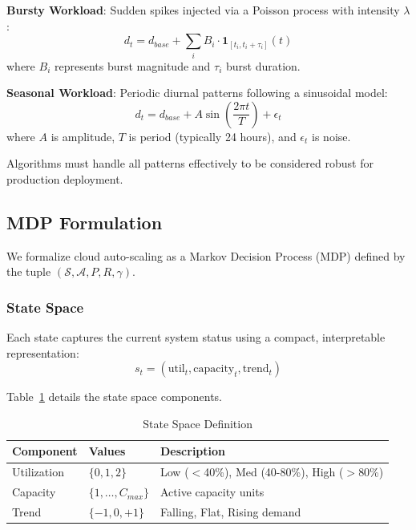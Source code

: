 \documentclass[conference]{IEEEtran}
\begin{document}
\textbf{Bursty Workload}: Sudden spikes injected via a Poisson process with intensity $\lambda$:
\begin{equation}
d_t = d_{base} + \sum_{i} B_i \cdot \mathbf{1}_{[t_i, t_i + \tau_i]}(t)
\end{equation}
where $B_i$ represents burst magnitude and $\tau_i$ burst duration.

\textbf{Seasonal Workload}: Periodic diurnal patterns following a sinusoidal model:
\begin{equation}
d_t = d_{base} + A \sin\left(\frac{2\pi t}{T}\right) + \epsilon_t
\end{equation}
where $A$ is amplitude, $T$ is period (typically 24 hours), and $\epsilon_t$ is noise.

Algorithms must handle all patterns effectively to be considered robust for production deployment.

\subsection{MDP Formulation}
We formalize cloud auto-scaling as a Markov Decision Process (MDP) defined by the tuple $(\mathcal{S}, \mathcal{A}, P, R, \gamma)$.

\subsubsection{State Space}
Each state captures the current system status using a compact, interpretable representation:
\begin{equation}
s_t = (\text{util}_t, \text{capacity}_t, \text{trend}_t)
\end{equation}

Table~\ref{tab:state_space} details the state space components.

\begin{table}[htbp]
\centering
\caption{State Space Definition}
\label{tab:state_space}
\begin{tabular}{lll}
\toprule
\textbf{Component} & \textbf{Values} & \textbf{Description} \\
\midrule
Utilization & $\{0,1,2\}$ & Low ($<$40\%), Med (40-80\%), High ($>$80\%) \\
Capacity & $\{1,\ldots,C_{max}\}$ & Active capacity units \\
Trend & $\{-1,0,+1\}$ & Falling, Flat, Rising demand \\
\bottomrule
\end{tabular}
\end{table}
\end{document}
